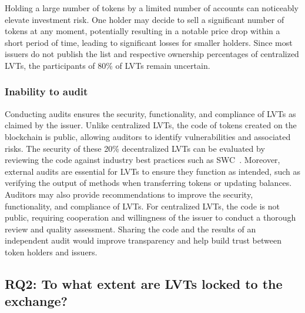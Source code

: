 Holding a large number of tokens by a limited number of accounts can noticeably elevate investment risk. One holder may decide to sell a significant number of tokens at any moment, potentially resulting in a notable price drop within a short period of time, leading to significant losses for smaller holders. Since most issuers do not publish the list and respective ownership percentages of centralized LVTs, the participants of 80\% of LVTs remain uncertain.

\subsubsection{Inability to audit}\label{sec:audit}
Conducting audits ensures the security, functionality, and compliance of LVTs as claimed by the issuer. Unlike centralized LVTs, the code of tokens created on the blockchain is public, allowing auditors to identify vulnerabilities and associated risks. The security of these 20\% decentralized LVTs can be evaluated by reviewing the code against industry best practices such as SWC~\cite{SWC}. Moreover, external audits are essential for LVTs to ensure they function as intended, such as verifying the output of methods when transferring tokens or updating balances. Auditors may also provide recommendations to improve the security, functionality, and compliance of LVTs. For centralized LVTs, the code is not public, requiring cooperation and willingness of the issuer to conduct a thorough review and quality assessment. Sharing the code and the results of an independent audit would improve transparency and help build trust between token holders and issuers.

\subsection{RQ2: To what extent are LVTs locked to the exchange?}\label{subsec:exchange}

